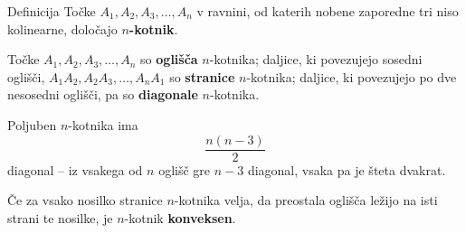         \begin{frame}
            \begin{alertblock}{Definicija}
                Točke $A_1, A_2, A_3, \dots, A_n$ v ravnini, od katerih nobene zaporedne tri niso kolinearne, določajo \textbf{$n$-kotnik}.

                Točke $A_1, A_2, A_3, \dots, A_n$ so \textbf{oglišča} $n$-kotnika;
                daljice, ki povezujejo sosedni oglišči, $A_1A_2, A_2A_3, \dots, A_nA_1$ so \textbf{stranice} $n$-kotnika;
                daljice, ki povezujejo po dve nesosedni oglišči, pa so \textbf{diagonale} $n$-kotnika.
            \end{alertblock}

            \begin{block}{}
                Poljuben $n$-kotnika ima $$\dfrac{n(n-3)}{2}$$ diagonal -- iz vsakega od $n$ oglišč gre $n-3$ diagonal, vsaka pa je šteta dvakrat.
            \end{block}

            \begin{block}{}
                Če za vsako nosilko stranice $n$-kotnika velja, da preostala oglišča ležijo na isti strani te nosilke, je $n$-kotnik \textbf{konveksen}.
            \end{block}
        \end{frame}





        \begin{frame}


            
        

            
        \end{frame}


